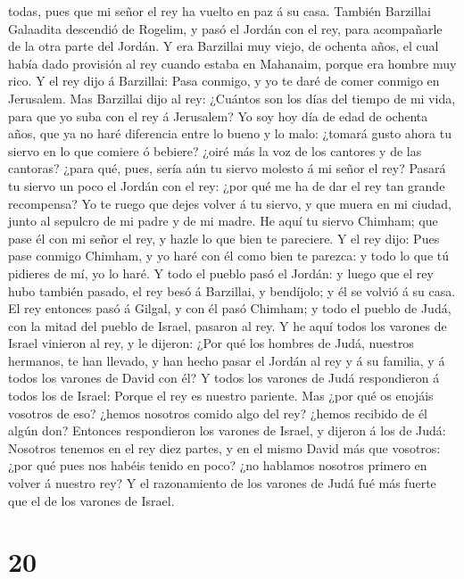 todas, pues que mi señor el rey ha vuelto en paz á su casa.
 También Barzillai Galaadita descendió de Rogelim, y pasó
el Jordán con el rey, para acompañarle de la otra parte del Jordán.
 Y era Barzillai muy viejo, de ochenta años, el cual había
dado provisión al rey cuando estaba en Mahanaim, porque era hombre muy
rico.  Y el rey dijo á Barzillai: Pasa conmigo, y yo te
daré de comer conmigo en Jerusalem.  Mas Barzillai dijo al
rey: ¿Cuántos son los días del tiempo de mi vida, para que yo suba con
el rey á Jerusalem?  Yo soy hoy día de edad de ochenta
años, que ya no haré diferencia entre lo bueno y lo malo: ¿tomará gusto
ahora tu siervo en lo que comiere ó bebiere? ¿oiré más la voz de los
cantores y de las cantoras? ¿para qué, pues, sería aún tu siervo molesto
á mi señor el rey?  Pasará tu siervo un poco el Jordán con
el rey: ¿por qué me ha de dar el rey tan grande recompensa?
 Yo te ruego que dejes volver á tu siervo, y que muera en
mi ciudad, junto al sepulcro de mi padre y de mi madre. He aquí tu
siervo Chimham; que pase él con mi señor el rey, y hazle lo que bien te
pareciere.  Y el rey dijo: Pues pase conmigo Chimham, y yo
haré con él como bien te parezca: y todo lo que tú pidieres de mí, yo lo
haré.  Y todo el pueblo pasó el Jordán: y luego que el rey
hubo también pasado, el rey besó á Barzillai, y bendíjolo; y él se
volvió á su casa.  El rey entonces pasó á Gilgal, y con él
pasó Chimham; y todo el pueblo de Judá, con la mitad del pueblo de
Israel, pasaron al rey.  Y he aquí todos los varones de
Israel vinieron al rey, y le dijeron: ¿Por qué los hombres de Judá,
nuestros hermanos, te han llevado, y han hecho pasar el Jordán al rey y
á su familia, y á todos los varones de David con él?  Y
todos los varones de Judá respondieron á todos los de Israel: Porque el
rey es nuestro pariente. Mas ¿por qué os enojáis vosotros de eso? ¿hemos
nosotros comido algo del rey? ¿hemos recibido de él algún don?
 Entonces respondieron los varones de Israel, y dijeron á
los de Judá: Nosotros tenemos en el rey diez partes, y en el mismo David
más que vosotros: ¿por qué pues nos habéis tenido en poco? ¿no hablamos
nosotros primero en volver á nuestro rey? Y el razonamiento de los
varones de Judá fué más fuerte que el de los varones de Israel.

\hypertarget{section-19}{%
\section{20}\label{section-19}}

